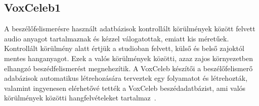 \subsection{VoxCeleb1} \label{voxceleb1}

A beszélőfelismerésre használt adatbázisok kontrollált körülmények között felvett audio anyagot tartalmaznak és kézzel válogatottak, emiatt kis méretűek. Kontrollált körülmény alatt értjük a studioban felvett, külső és belső zajoktól mentes hanganyagot. Ezek a valós körülmények közötti, azaz zajos környezetben elhangzó beszédfelismerést megnehezítik. A VoxCeleb készítői a beszélőfelismerő adabázisok automatikus létrehozására terveztek egy folyamatot és létrehozták, valamint ingyenesen elérhetővé tették a VoxCeleb beszédadatbázist, ami valós körülmények közötti hangfelvételeket tartalmaz~\cite{voxceleb1}.
\newline
\newline

